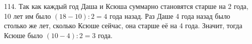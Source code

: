 114. Так как каждый год Даша и Ксюша суммарно становятся старше на 2 года, 10 лет им было $(18-10):2=4$ года назад. Раз Даше 4 года назад было столько же лет, сколько Ксюше сейчас, она старше её на 4 года. Значит, тогда Ксюше было $(10-4):2=3$ года.\\

